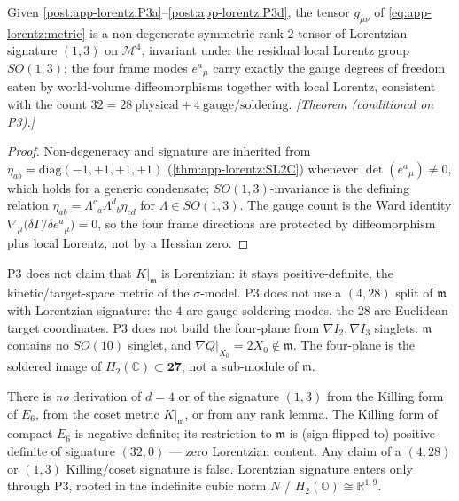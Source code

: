 \begin{theorem}
\label{thm:app-lorentz:P3consistency}
Given \autoref{post:app-lorentz:P3a}--\autoref{post:app-lorentz:P3d}, the tensor
$g_{\mu\nu}$ of \eqref{eq:app-lorentz:metric} is a non-degenerate symmetric rank-$2$
tensor of Lorentzian signature $(1,3)$ on $\mathcal{M}^{4}$, invariant under the
residual local Lorentz group $SO(1,3)$; the four frame modes $e^{a}{}_{\mu}$ carry
exactly the gauge degrees of freedom eaten by world-volume diffeomorphisms together
with local Lorentz, consistent with the count $32=28\ \text{physical}+4\ \text{gauge/soldering}$.
\emph{[Theorem (conditional on P3).]}
\end{theorem}

\begin{proof}
Non-degeneracy and signature are inherited from
$\eta_{ab}=\mathrm{diag}(-1,+1,+1,+1)$ (\autoref{thm:app-lorentz:SL2C}) whenever
$\det(e^{a}{}_{\mu})\ne0$, which holds for a generic condensate;
$SO(1,3)$-invariance is the defining relation
$\eta_{ab}=\Lambda^{c}{}_{a}\Lambda^{d}{}_{b}\eta_{cd}$ for
$\Lambda\in SO(1,3)$. The gauge count is the Ward identity
$\nabla_{\mu}\big(\delta\Gamma/\delta e^{a}{}_{\mu}\big)=0$, so the four frame
directions are protected by diffeomorphism plus local Lorentz, not by a Hessian zero.
\end{proof}

\begin{remark}
\label{rmk:app-lorentz:notclaim}
P3 does not claim that $K|_{\mathfrak{m}}$ is Lorentzian: it stays positive-definite,
the kinetic/target-space metric of the $\sigma$-model. P3 does not use a $(4,28)$
split of $\mathfrak{m}$ with Lorentzian signature: the $4$ are gauge soldering modes,
the $28$ are Euclidean target coordinates. P3 does not build the four-plane from
$\nabla I_{2},\nabla I_{3}$ singlets: $\mathfrak{m}$ contains no $SO(10)$ singlet, and
$\nabla Q|_{X_{0}}=2X_{0}\notin\mathfrak{m}$. The four-plane is the soldered image of
$H_{2}(\mathbb{C})\subset\mathbf{27}$, not a sub-module of $\mathfrak{m}$.
\end{remark}

\begin{remark}
\label{rmk:app-lorentz:anti}
There is \emph{no} derivation of $d=4$ or of the signature $(1,3)$ from the Killing
form of $E_{6}$, from the coset metric $K|_{\mathfrak{m}}$, or from any rank lemma.
The Killing form of compact $E_{6}$ is negative-definite; its restriction to
$\mathfrak{m}$ is (sign-flipped to) positive-definite of signature $(32,0)$ --- zero
Lorentzian content. Any claim of a $(4,28)$ or $(1,3)$ Killing/coset signature is
false. Lorentzian signature enters only through P3, rooted in the indefinite cubic
norm $N$ / $H_{2}(\mathbb{O})\cong\mathbb{R}^{1,9}$.
\end{remark}

